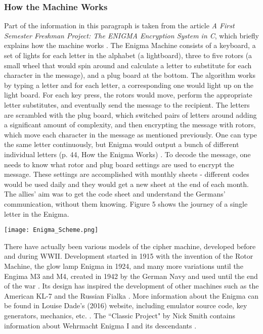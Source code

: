 \documentclass[a4paper, 12pt, titlepage]{article}
\begin{document}
\subsubsection{How the Machine Works}
Part of the information in this paragraph is taken from the article \textit{A First Semester Freshman Project: The ENIGMA Encryption System in C}, which briefly explains how the machine works \cite{EnigmaInC}. The Enigma Machine consists of a keyboard, a set of lights for each letter in the alphabet (a lightboard), three to five rotors (a small wheel that would spin around and calculate a letter to substitute for each character in the message), and a plug board at the bottom. The algorithm works by typing a letter and for each letter, a corresponding one would light up on the light board. For each key press, the rotors would move, perform the appropriate letter substitutes, and eventually send the message to the recipient. The letters are scrambled with the plug board, which switched pairs of letters around adding a significant amount of complexity, and then encrypting the message with rotors, which move each character in the message as mentioned previously. One can type the same letter continuously, but Enigma would output a bunch of different individual letters (p. 44, How the Enigma Works) \cite{EnigmaInC}. To decode the message, one needs to know what rotor and plug board settings are used to encrypt the message. These settings are accomplished with monthly sheets - different codes would be used daily and they would get a new sheet at the end of each month. The allies' aim was to get the code sheet and understand the Germans' communication, without them knowing. Figure 5 shows the journey of a single letter in the Enigma. \\[6pt]

\begin{center}
\texttt{[image: Enigma\_Scheme.png]}
\label{fig:Enigma}
\end{center}
There have actually been various models of the cipher machine, developed before and during WWII. Development started in 1915 with the invention of the Rotor Machine, the glow lamp Enigma in 1924, and many more variations until the Engima M3 and M4, created in 1942 by the German Navy and used until the end of the war \cite{EnigmaVersions}. Its design has inspired the development of other machines such as the American KL-7 and the Russian Fialka \cite{EnigmaVersions}. More information about the Enigma can be found in Louise Dade's (2016) website, including emulator source code, key generators, mechanics, etc. \cite{TheEnigma}. The ``Classic Project" by Nick Smith contains information about Wehrmacht Enigma I and its descendants \cite{ClassicEnigma}.
\end{document}
